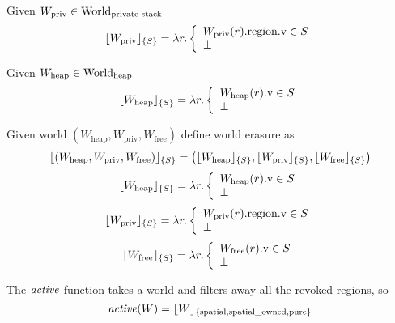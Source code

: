   \begin{definition}
    Given $W_{\mathrm{priv}} \in \mathrm{World}_\text{private stack}$
    \[
\lfloor W_{\mathrm{priv}} \rfloor_{\{S\}} = \lambda r \ldotp \left\{
    \begin{array}{l}
      W_{\mathrm{priv}}(r).\mathrm{region}.\mathrm{v} \in S \\
      \bot
    \end{array}
  \right.
\]
  \end{definition}
  \begin{definition}
    Given $W_{\mathrm{heap}} \in \mathrm{World}_\mathrm{heap}$
    \[
      \lfloor W_{\mathrm{heap}} \rfloor_{\{S\}} = \lambda r \ldotp \left\{
        \begin{array}{l}
          W_{\mathrm{heap}}(r).\mathrm{v} \in S\\
          \bot
        \end{array}
      \right.
    \]
  \end{definition}
  \begin{definition}
    Given world $(W_{\mathrm{heap}},W_{\mathrm{priv}},W_{\mathrm{free}})$ define world erasure as
\[
\lfloor (W_{\mathrm{heap}},W_{\mathrm{priv}},W_{\mathrm{free}}) \rfloor_{\{S\}} =
  \left( \lfloor W_{\mathrm{heap}} \rfloor_{\{S\}},\lfloor W_{\mathrm{priv}} \rfloor_{\{S\}},\lfloor W_{\mathrm{free}} \rfloor_{\{S\}} \right)
\]
\[
\lfloor W_{\mathrm{heap}} \rfloor_{\{S\}} = \lambda r \ldotp \left\{
    \begin{array}{l}
      W_{\mathrm{heap}}(r).\mathrm{v} \in S\\
      \bot
    \end{array}
  \right.
\]
\[
\lfloor W_{\mathrm{priv}} \rfloor_{\{S\}} = \lambda r \ldotp \left\{
    \begin{array}{l}
      W_{\mathrm{priv}}(r).\mathrm{region}.\mathrm{v} \in S \\
      \bot
    \end{array}
  \right.
\]
\[
\lfloor W_{\mathrm{free}} \rfloor_{\{S\}} = \lambda r \ldotp \left\{
    \begin{array}{l}
      W_{\mathrm{free}}(r).\mathrm{v} \in S\\
      \bot
    \end{array}
  \right.
\]

The $\activeReg{}$ function takes a world and filters away all the revoked regions, so
\[
  \activeReg{W} = \erase{W}{\spatial,\spatialo,\pure}
\]
  \end{definition}

